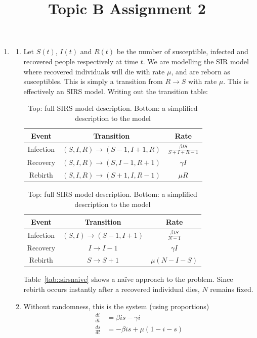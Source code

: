 \documentclass{/home/janmebows/Documents/LatexTemplates/myassignment}
\title{Topic B Assignment 2}
\begin{document}
\maketitle


\begin{enumerate}
	\item 
	\begin{enumerate}[label=(\roman*)]
		\item Let $S(t)$, $I(t)$ and $R(t)$ be the number of susceptible, infected and recovered people respectively at time $t$. We are modelling the SIR model where recovered individuals will die with rate $\mu$, and are reborn as susceptibles. This is simply a transition from $R\to S$ with rate $\mu$. This is effectively an SIRS model. Writing out the transition table:
		\begin{table}[tb]
		\centering
		\label{tab::sirsnaive}
		 	\begin{tabular}{c|c|c}
		 		Event&Transition&Rate\\
		 		\hline 
		 		Infection & $(S,I,R)\to (S-1,I+1,R)$ & $\frac{\beta IS}{S+I+R-1}$\\
		 		Recovery & $(S,I,R) \to (S,I-1,R+1)$ & $\gamma I$\\ 
		 		Rebirth & $(S,I,R)\to (S+1,I,R-1)$& $\mu R$
		 	\end{tabular}
		\label{tab::sirs}
		 	\begin{tabular}{c|c|c}
		 		Event&Transition&Rate\\
		 		\hline 
		 		Infection & $(S,I)\to (S-1,I+1)$ & $\frac{\beta IS}{N-1}$\\
		 		Recovery & $I \to I-1$ & $\gamma I$\\ 
		 		Rebirth & $S\to S+1$& $\mu (N-I-S)$
		 	\end{tabular}
		 	\caption{Top: full SIRS model description. Bottom: a simplified description to the model}
		 \end{table} 
		 Table~\ref{tab::sirsnaive} shows a na\"ive approach to the problem. Since rebirth occurs instantly after a recovered individual dies, $N$ remains fixed. 
		\begin{table}[tb]
		\centering
		 \end{table} 
		\item %
		Without randomness, this is the system (using proportions)
		\begin{align*}
			\frac{di}{dt} &= \beta is - \gamma i\\
			\frac{ds}{dt} &= -\beta is + \mu(1-i-s)
		\end{align*}

\end{enumerate}
\end{enumerate}
\end{document}
